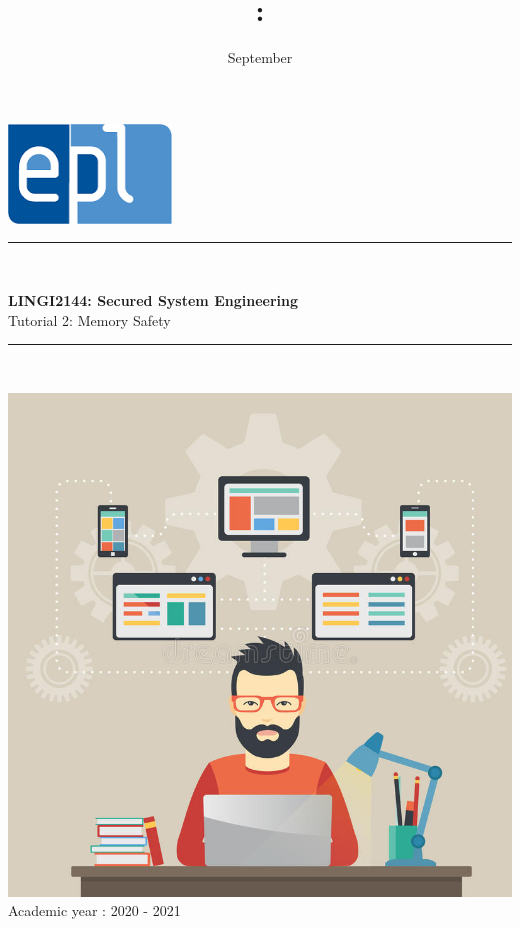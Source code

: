 \documentclass{article}
\title{\codecourse : \titlecourse}
\author{\othor}
\date{September \year}
\newcommand{\codecourse}{LINGI2144}
\newcommand{\titlecourse}{Secured System Engineering}
\newcommand{\ayear}{2020 - 2021}
\begin{document}
        \hfill\includegraphics[scale=0.5]{image/logoepl.png}
        
        \vspace*{\fill}
            
        \begin{center}
        
            \rule{1\textwidth}{1pt}\\
	            \vspace{0.5\baselineskip}
		            \begin{LARGE}
	                	\textbf{\codecourse : \titlecourse}\\
	                	Tutorial 2: Memory Safety
		            \end{LARGE}
		        \vspace{0.5\baselineskip}       
	        \rule{1\textwidth}{1pt}\\
	        
	        \vspace{0.5\baselineskip}
	        
	        \includegraphics[scale=1.5]{image/MCP.jpg}\\

	        \vspace{0.5\baselineskip}
	            Academic year : \ayear\\
                
		\end{center}
		
\end{document}
